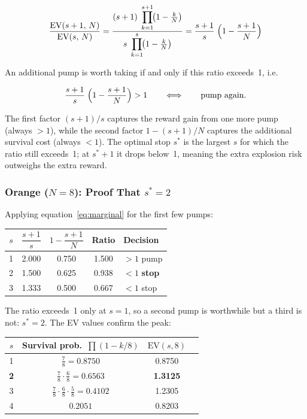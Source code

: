 \documentclass[11pt,a4paper]{article}
\begin{document}
\begin{equation}
\frac{\text{EV}(s+1,\,N)}{\text{EV}(s,\,N)}
  = \frac{(s+1)\;\displaystyle\prod_{k=1}^{s+1}\!\bigl(1 - \tfrac{k}{N}\bigr)}
         {s\;\displaystyle\prod_{k=1}^{s}\!\bigl(1 - \tfrac{k}{N}\bigr)}
  = \frac{s+1}{s}\;\Bigl(1 - \frac{s+1}{N}\Bigr)
\end{equation}

An additional pump is worth taking if and only if this ratio exceeds~1, i.e.

\begin{equation}
\label{eq:marginal}
\frac{s+1}{s}\;\Bigl(1 - \frac{s+1}{N}\Bigr) > 1
\qquad\Longleftrightarrow\qquad
\text{pump again.}
\end{equation}

The first factor $(s{+}1)/s$ captures the reward gain from one more pump
(always $> 1$), while the second factor $1 - (s{+}1)/N$ captures the
additional survival cost (always $< 1$). The optimal stop $s^*$ is the
largest $s$ for which the ratio still exceeds~1; at $s^* + 1$ it drops
below~1, meaning the extra explosion risk outweighs the extra reward.

\subsubsection*{Orange ($N = 8$): Proof That $s^* = 2$}

Applying equation~\eqref{eq:marginal} for the first few pumps:

\begin{center}
\begin{tabular}{@{}ccccl@{}}
\toprule
$s$ & $\dfrac{s+1}{s}$ & $1 - \dfrac{s+1}{N}$ & Ratio & Decision \\[4pt]
\midrule
1 & 2.000 & 0.750 & 1.500 & $> 1$ \;\;pump \\[2pt]
2 & 1.500 & 0.625 & 0.938 & $< 1$ \;\;\textbf{stop} \\[2pt]
3 & 1.333 & 0.500 & 0.667 & $< 1$ \;\;stop \\
\bottomrule
\end{tabular}
\end{center}

The ratio exceeds~1 only at $s = 1$, so a second pump is worthwhile but a
third is not: $s^* = 2$. The EV values confirm the peak:

\begin{center}
\begin{tabular}{@{}cccc@{}}
\toprule
$s$ & Survival prob.\ $\prod(1 - k/8)$ & $\text{EV}(s, 8)$ \\
\midrule
1 & $\tfrac{7}{8} = 0.8750$ & 0.8750 \\[2pt]
\textbf{2} & $\tfrac{7}{8} \cdot \tfrac{6}{8} = 0.6563$ & \textbf{1.3125} \\[2pt]
3 & $\tfrac{7}{8} \cdot \tfrac{6}{8} \cdot \tfrac{5}{8} = 0.4102$ & 1.2305 \\[2pt]
4 & $0.2051$ & 0.8203 \\
\bottomrule
\end{tabular}
\end{center}
\end{document}
